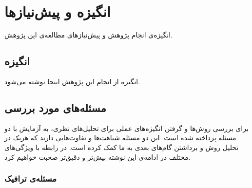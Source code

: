 \documentclass[a4paper,11px]{article}
\begin{document}
\section{
انگیزه و پیش‌نیازها
}

انگیزه‌ی انجام پژوهش و پیش‌نیازهای مطالعه‌ی این پژوهش.













\subsection{
انگیزه
}

انگیزه از انجام این پژوهش اینجا نوشته می‌شود.



\subsection{
مسئله‌های مورد بررسی
}
برای بررسی روش‌ها و گرفتن انگیزه‌های عملی برای تحلیل‌های نظری، به آزمایش با دو مسئله پرداخته شده است. این دو مسئله شباهت‌ها و تفاوت‌هایی دارند که هریک در تحلیل روش و برداشتن گام‌های بعدی به ما کمک کرده است. در رابطه با ویژگی‌های مختلف در ادامه‌ی این نوشته بیش‌تر و دقیق‌تر صحبت خواهیم کرد.

\subsubsection{
مسئله‌ی ترافیک
}
\end{document}
